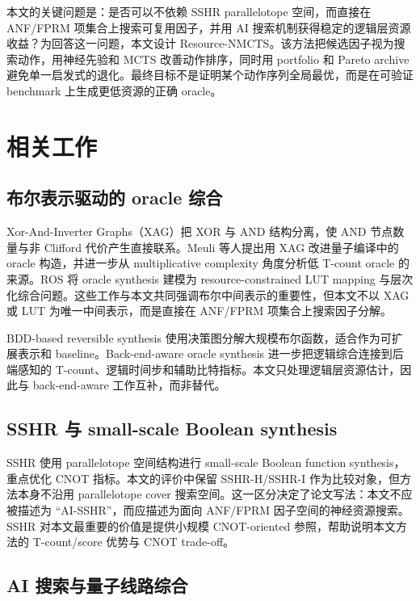 \documentclass[UTF8,fontset=macnew,11pt]{ctexart}
\newcommand{\method}{Resource-NMCTS}
\begin{document}
本文的关键问题是：是否可以不依赖 SSHR parallelotope 空间，而直接在 ANF/FPRM 项集合上搜索可复用因子，并用 AI 搜索机制获得稳定的逻辑层资源收益？为回答这一问题，本文设计 \method{}。该方法把候选因子视为搜索动作，用神经先验和 MCTS 改善动作排序，同时用 portfolio 和 Pareto archive 避免单一启发式的退化。最终目标不是证明某个动作序列全局最优，而是在可验证 benchmark 上生成更低资源的正确 oracle。

\section{相关工作}

\subsection{布尔表示驱动的 oracle 综合}

Xor-And-Inverter Graphs（XAG）把 XOR 与 AND 结构分离，使 AND 节点数量与非 Clifford 代价产生直接联系。Meuli 等人提出用 XAG 改进量子编译中的 oracle 构造\cite{meuli2022xag}，并进一步从 multiplicative complexity 角度分析低 T-count oracle 的来源\cite{meuli2019multiplicative}。ROS 将 oracle synthesis 建模为 resource-constrained LUT mapping 与层次化综合问题\cite{meuli2020ros}。这些工作与本文共同强调布尔中间表示的重要性，但本文不以 XAG 或 LUT 为唯一中间表示，而是直接在 ANF/FPRM 项集合上搜索因子分解。

BDD-based reversible synthesis 使用决策图分解大规模布尔函数，适合作为可扩展表示和 baseline\cite{wille2009bdd}。Back-end-aware oracle synthesis 进一步把逻辑综合连接到后端感知的 T-count、逻辑时间步和辅助比特指标\cite{yu2025backend}。本文只处理逻辑层资源估计，因此与 back-end-aware 工作互补，而非替代。

\subsection{SSHR 与 small-scale Boolean synthesis}

SSHR 使用 parallelotope 空间结构进行 small-scale Boolean function synthesis，重点优化 CNOT 指标\cite{zheng2025sshr}。本文的评价中保留 SSHR-H/SSHR-I 作为比较对象，但方法本身不沿用 parallelotope cover 搜索空间。这一区分决定了论文写法：本文不应被描述为 ``AI-SSHR''，而应描述为面向 ANF/FPRM 因子空间的神经资源搜索。SSHR 对本文最重要的价值是提供小规模 CNOT-oriented 参照，帮助说明本文方法的 T-count/score 优势与 CNOT trade-off。

\subsection{AI 搜索与量子线路综合}
\end{document}
